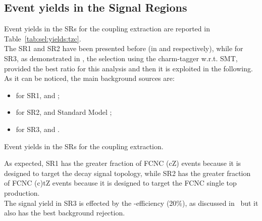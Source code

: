 \subsection{Event yields in the Signal Regions}
Event yields in the SRs for the \tZc coupling extraction are reported in Table~\ref{tab:sel:yields:tzc}.\\
The SR1 and SR2 have been presented before (in  and  respectively),
while for SR3, as demonstrated in , the selection using the charm-tagger \DLrc
w.r.t. SMT, provided the best \ssplusb ratio for this analysis and then it is exploited in the following.\\
As it can be noticed, the main background sources are:
\begin{itemize}
	\item for SR1\tZc, \ttZ and \VVHF;
	\item for SR2\tZc, \VVHF and Standard Model \tZq ;
	\item for SR3\tZc, \ttZ and \VVHF .
\end{itemize}

\begin{table}[!htbp]
	\centering
	\small
	
	\caption{Event yields in the SRs for the \tZc coupling extraction. \TabErrStatOnly} 
	\label{tab:sel:yields:tzc}
\end{table} 
\noindent As expected, SR1 has the greater fraction of FCNC \ttbar(cZ) events because it is designed to target the decay signal topology, while SR2 has the greater fraction of FCNC (c)tZ events because it is designed to target the FCNC single top production.\\
The signal yield in SR3 is effected by the \DLrc  \Pqc-efficiency (20\%), as discussed in~ but it also has the best background rejection.

\clearpage
